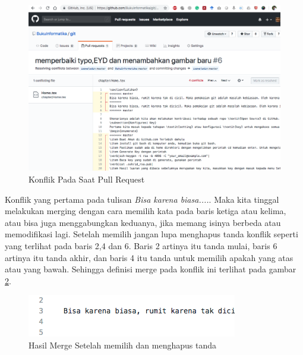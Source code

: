 \begin{figure}[!htbp]
\centerline{\includegraphics[width=.75\textwidth]{Figures/webkonflik3}}
\caption{Konflik Pada Saat Pull Request}
\label{fig:webkonflik3}
\end{figure}

Konflik yang pertama pada tulisan \textit{Bisa karena biasa....}. Maka kita tinggal melakukan merging dengan cara memilih kata pada baris ketiga atau kelima, atau bisa juga menggabungkan keduanya, jika memang isinya berbeda atau memodifikasi lagi. Setelah memilih jangan lupa menghapus tanda konflik seperti yang terlihat pada baris 2,4 dan 6. Baris 2 artinya itu tanda mulai, baris 6 artinya itu tanda akhir, dan baris 4 itu tanda untuk memilih apakah yang atas atau yang bawah. Sehingga definisi merge pada konflik ini terlihat pada gambar \ref{fig:webkonflik5}.



\begin{figure}[!htbp]
\centerline{\includegraphics[width=.75\textwidth]{Figures/webkonflik5}}
\caption{Hasil Merge Setelah memilih dan menghapus tanda}
\label{fig:webkonflik5}
\end{figure}



